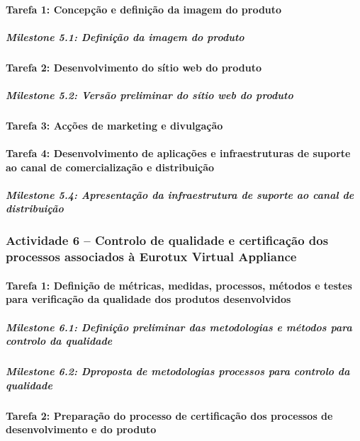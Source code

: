 \documentclass[a4paper,12pt,portugues]{article}
\begin{document}
\paragraph{Tarefa 1: Concepção e definição da imagem do produto}

\subparagraph{Milestone 5.1: Definição da imagem do produto}


\paragraph{Tarefa 2: Desenvolvimento do sítio web do produto}

\subparagraph{Milestone 5.2: Versão preliminar do sítio web do produto}


\paragraph{Tarefa 3: Acções de marketing e divulgação}

\paragraph{Tarefa 4: Desenvolvimento de aplicações e infraestruturas de suporte ao canal de comercialização e distribuição}

\subparagraph{Milestone 5.4: Apresentação da infraestrutura de suporte ao canal de distribuição}


\subsubsection*{Actividade 6 – Controlo de qualidade e certificação dos processos associados à Eurotux Virtual Appliance}

\paragraph{Tarefa 1: Definição de métricas, medidas, processos,  métodos e testes para verificação da qualidade dos produtos desenvolvidos}

\subparagraph{Milestone 6.1: Definição preliminar das metodologias e métodos para controlo da qualidade}

\subparagraph{Milestone 6.2: Dproposta de metodologias processos para controlo da qualidade}


\paragraph{Tarefa 2: Preparação do processo de certificação dos processos de desenvolvimento e do produto}
\end{document}

